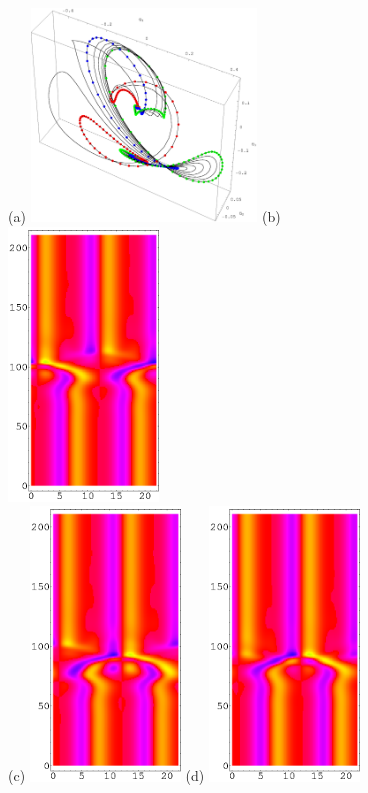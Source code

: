 \begin{figure}[t] %
\centering
(a) \includegraphics[width=6.0cm]{figs/ks22.0-2w-neighborhood.eps}
\hspace{0.1in}
(b) \includegraphics[width=4.0cm]{figs/ks22.0-2w-R.eps}
\\
(c) \includegraphics[width=4.0cm]{figs/ks22.0-2w-G.eps}
\hspace{0.1in}
(d) \includegraphics[width=4.0cm]{figs/ks22.0-2w-B.eps}

\end{figure}
